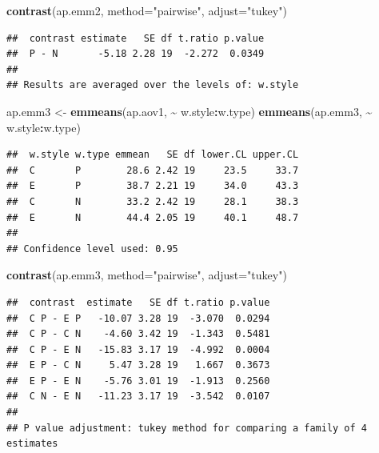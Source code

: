 \documentclass[
]{book}
\newenvironment{Shaded}{\begin{snugshade}}{\end{snugshade}}
\newcommand{\AttributeTok}[1]{\textcolor[rgb]{0.13,0.29,0.53}{#1}}
\newcommand{\FunctionTok}[1]{\textcolor[rgb]{0.13,0.29,0.53}{\textbf{#1}}}
\newcommand{\NormalTok}[1]{#1}
\newcommand{\OtherTok}[1]{\textcolor[rgb]{0.56,0.35,0.01}{#1}}
\newcommand{\SpecialCharTok}[1]{\textcolor[rgb]{0.81,0.36,0.00}{\textbf{#1}}}
\newcommand{\StringTok}[1]{\textcolor[rgb]{0.31,0.60,0.02}{#1}}
\begin{document}
\begin{Shaded}
\begin{Highlighting}[]
\FunctionTok{contrast}\NormalTok{(ap.emm2, }\AttributeTok{method=}\StringTok{"pairwise"}\NormalTok{, }\AttributeTok{adjust=}\StringTok{"tukey"}\NormalTok{)}
\end{Highlighting}
\end{Shaded}

\begin{verbatim}
##  contrast estimate   SE df t.ratio p.value
##  P - N       -5.18 2.28 19  -2.272  0.0349
## 
## Results are averaged over the levels of: w.style
\end{verbatim}

\begin{Shaded}
\begin{Highlighting}[]
\NormalTok{ap.emm3 }\OtherTok{\textless{}{-}} \FunctionTok{emmeans}\NormalTok{(ap.aov1, }\SpecialCharTok{\textasciitilde{}}\NormalTok{ w.style}\SpecialCharTok{:}\NormalTok{w.type)}
\FunctionTok{emmeans}\NormalTok{(ap.emm3, }\SpecialCharTok{\textasciitilde{}}\NormalTok{ w.style}\SpecialCharTok{:}\NormalTok{w.type)}
\end{Highlighting}
\end{Shaded}

\begin{verbatim}
##  w.style w.type emmean   SE df lower.CL upper.CL
##  C       P        28.6 2.42 19     23.5     33.7
##  E       P        38.7 2.21 19     34.0     43.3
##  C       N        33.2 2.42 19     28.1     38.3
##  E       N        44.4 2.05 19     40.1     48.7
## 
## Confidence level used: 0.95
\end{verbatim}

\begin{Shaded}
\begin{Highlighting}[]
\FunctionTok{contrast}\NormalTok{(ap.emm3, }\AttributeTok{method=}\StringTok{"pairwise"}\NormalTok{, }\AttributeTok{adjust=}\StringTok{"tukey"}\NormalTok{)}
\end{Highlighting}
\end{Shaded}

\begin{verbatim}
##  contrast  estimate   SE df t.ratio p.value
##  C P - E P   -10.07 3.28 19  -3.070  0.0294
##  C P - C N    -4.60 3.42 19  -1.343  0.5481
##  C P - E N   -15.83 3.17 19  -4.992  0.0004
##  E P - C N     5.47 3.28 19   1.667  0.3673
##  E P - E N    -5.76 3.01 19  -1.913  0.2560
##  C N - E N   -11.23 3.17 19  -3.542  0.0107
## 
## P value adjustment: tukey method for comparing a family of 4 estimates
\end{verbatim}
\end{document}
